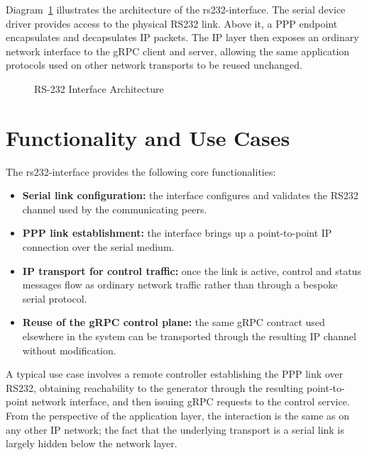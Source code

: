 Diagram~\ref{fig:rs232-interface-architecture} illustrates the architecture of
the \gls{rs232-interface}. The serial device driver provides access to the
physical \gls{RS232} link. Above it, a \gls{PPP} endpoint encapsulates and
decapsulates IP packets. The IP layer then exposes an ordinary network
interface to the gRPC client and server, allowing the same application
protocols used on other network transports to be reused unchanged.

\begin{figure}[htbp]
      \centering
      
      \caption{RS-232 Interface Architecture}
      \label{fig:rs232-interface-architecture}
\end{figure}

\section{Functionality and Use Cases}

The \gls{rs232-interface} provides the following core functionalities:

\begin{itemize}
      \item \textbf{Serial link configuration:} the interface configures and
            validates the \gls{RS232} channel used by the communicating peers.
      \item \textbf{\gls{PPP} link establishment:} the interface brings up a
            point-to-point IP connection over the serial medium.
      \item \textbf{IP transport for control traffic:} once the link is active,
            control and status messages flow as ordinary network traffic rather
            than through a bespoke serial protocol.
      \item \textbf{Reuse of the gRPC control plane:} the same gRPC contract
            used elsewhere in the system can be transported through the
            resulting IP channel without modification.
\end{itemize}

A typical use case involves a remote controller establishing the \gls{PPP} link
over \gls{RS232}, obtaining reachability to the generator through the resulting
point-to-point network interface, and then issuing gRPC requests to the control
service. From the perspective of the application layer, the interaction is the
same as on any other IP network; the fact that the underlying transport is a
serial link is largely hidden below the network layer.
